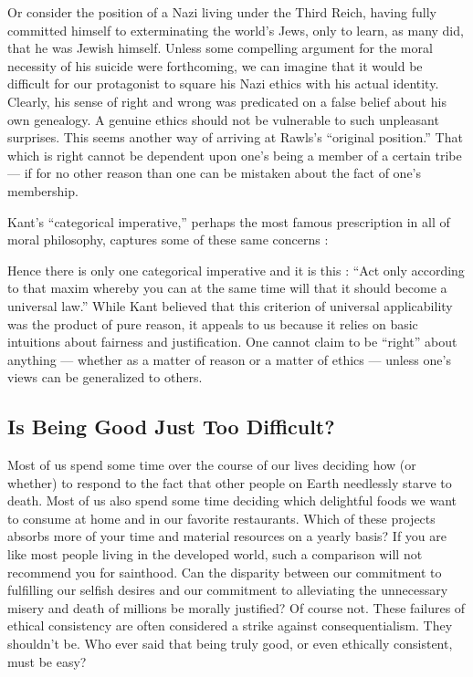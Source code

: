 \documentclass[a4paper,14pt]{extarticle}
\begin{document}
Or consider the position of a Nazi living under the Third Reich, having fully committed himself to exterminating the world's Jews, only to learn, as many did, that he was Jewish himself.
Unless some compelling argument for the moral necessity of his suicide were forthcoming, we can imagine that it would be difficult for our protagonist to square his Nazi ethics with his actual identity.
Clearly, his sense of right and wrong was predicated on a false belief about his own genealogy.
A genuine ethics should not be vulnerable to such unpleasant surprises.
This seems another way of arriving at Rawls's ``original position.''
That which is right cannot be dependent upon one's being a member of a certain tribe --- if for no other reason than one can be mistaken about the fact of one's membership.

Kant's ``categorical imperative,'' perhaps the most famous prescription in all of moral philosophy, captures some of these same concerns :

Hence there is only one categorical imperative and it is this :
``Act only according to that maxim whereby you can at the same time will that it should become a universal law.''
While Kant believed that this criterion of universal applicability was the product of pure reason, it appeals to us because it relies on basic intuitions about fairness and justification.
One cannot claim to be ``right'' about anything --- whether as a matter of reason or a matter of ethics --- unless one's views can be generalized to others.

\subsection{Is Being Good Just Too Difficult?}

Most of us spend some time over the course of our lives deciding how (or whether) to respond to the fact that other people on Earth needlessly starve to death.
Most of us also spend some time deciding which delightful foods we want to consume at home and in our favorite restaurants.
Which of these projects absorbs more of your time and material resources on a yearly basis?
If you are like most people living in the developed world, such a comparison will not recommend you for sainthood.
Can the disparity between our commitment to fulfilling our selfish desires and our commitment to alleviating the unnecessary misery and death of millions be morally justified?
Of course not.
These failures of ethical consistency are often considered a strike against consequentialism.
They shouldn't be.
Who ever said that being truly good, or even ethically consistent, must be easy?
\end{document}
